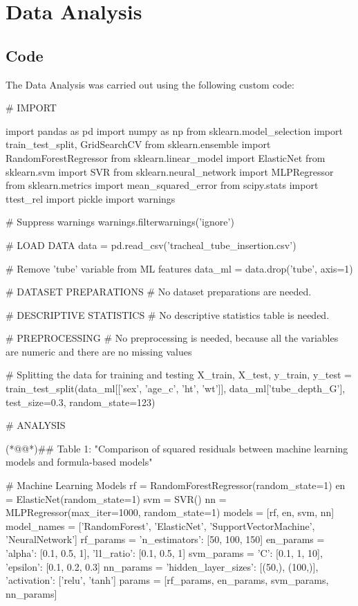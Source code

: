\documentclass[11pt]{article}
\begin{document}
\section{Data Analysis}
\subsection{{Code}}
The Data Analysis was carried out using the following custom code:

\begin{python}

# IMPORT

import pandas as pd
import numpy as np
from sklearn.model_selection import train_test_split, GridSearchCV
from sklearn.ensemble import RandomForestRegressor
from sklearn.linear_model import ElasticNet
from sklearn.svm import SVR
from sklearn.neural_network import MLPRegressor
from sklearn.metrics import mean_squared_error
from scipy.stats import ttest_rel
import pickle
import warnings

# Suppress warnings
warnings.filterwarnings('ignore')

# LOAD DATA
data = pd.read_csv('tracheal_tube_insertion.csv')

# Remove 'tube' variable from ML features
data_ml = data.drop('tube', axis=1)

# DATASET PREPARATIONS
# No dataset preparations are needed.

# DESCRIPTIVE STATISTICS
# No descriptive statistics table is needed.

# PREPROCESSING
# No preprocessing is needed, because all the variables are numeric and there are no missing values

# Splitting the data for training and testing
X_train, X_test, y_train, y_test = train_test_split(data_ml[['sex', 'age_c', 'ht', 'wt']], data_ml['tube_depth_G'], test_size=0.3, random_state=123)

# ANALYSIS

(*@@*)## Table 1: "Comparison of squared residuals between machine learning models and formula-based models"

# Machine Learning Models
rf = RandomForestRegressor(random_state=1)
en = ElasticNet(random_state=1)
svm = SVR()
nn = MLPRegressor(max_iter=1000, random_state=1)
models = [rf, en, svm, nn]
model_names = ['RandomForest', 'ElasticNet', 'SupportVectorMachine', 'NeuralNetwork']
rf_params = {'n_estimators': [50, 100, 150]}
en_params = {'alpha': [0.1, 0.5, 1], 'l1_ratio': [0.1, 0.5, 1]}
svm_params = {'C': [0.1, 1, 10], 'epsilon': [0.1, 0.2, 0.3]}
nn_params = {'hidden_layer_sizes': [(50,), (100,)], 'activation': ['relu', 'tanh']}
params = [rf_params, en_params, svm_params, nn_params]


\end{python}
\end{document}
